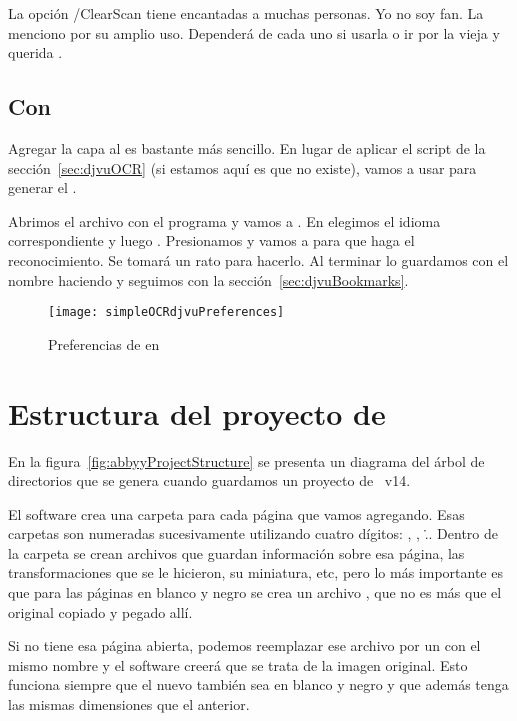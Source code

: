\documentclass[%
	a5paper,
	10pt,
	twoside,
	openright,
	final,
]{memoir}
\begin{document}
{	La opción /ClearScan tiene encantadas a muchas personas. Yo no soy fan. La menciono por su amplio uso. Dependerá de cada uno si usarla o ir por la vieja y querida .

	\section{Con \djvueditor} Agregar la capa al \djvu es bastante más sencillo. En lugar de aplicar el script de la sección~\ref{sec:djvuOCR} (si estamos aquí es que no existe), vamos a usar \djvueditor para generar el \ocr.

	Abrimos el archivo  con el programa y vamos a . En  elegimos el idioma correspondiente y luego . Presionamos  y vamos a  para que haga el reconocimiento. Se tomará un rato para hacerlo. Al terminar lo guardamos con el nombre  haciendo  y seguimos con la sección~\ref{sec:djvuBookmarks}.

	\begin{figure}
		\texttt{[image: simpleOCRdjvuPreferences]}
		\caption{Preferencias de \ocr en \djvueditor\label{fig:simpleOCRdjvuPreferences}}
	\end{figure}

\chapter{Estructura del proyecto de \label{sec:abbyyProjectStructure}} En la figura~\ref{fig:abbyyProjectStructure} se presenta un diagrama del árbol de directorios que se genera cuando guardamos un proyecto de \abbyy~v14.

El software crea una carpeta para cada página que vamos agregando. Esas carpetas son numeradas sucesivamente utilizando cuatro dígitos: , , \... Dentro de la carpeta se crean archivos que guardan información sobre esa página, las transformaciones que se le hicieron, su miniatura, etc, pero lo más importante es que para las páginas en blanco y negro se crea un archivo , que no es más que el \tiff original copiado y pegado allí.

Si \abbyy no tiene esa página abierta, podemos reemplazar ese archivo por un \tiff con el mismo nombre y el software creerá que se trata de la imagen original. Esto funciona siempre que el nuevo \tiff también sea en blanco y negro y que además tenga las mismas dimensiones que el anterior.

}
\end{document}

